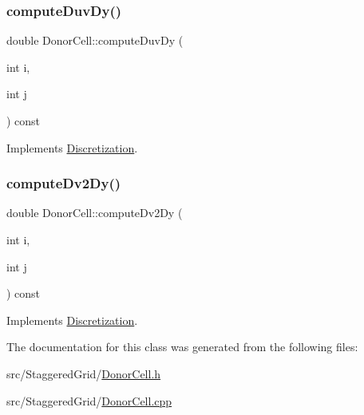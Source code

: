 \subsubsection{\texorpdfstring{computeDuvDy()}{computeDuvDy()}}
{\footnotesize\ttfamily double Donor\+Cell\+::compute\+Duv\+Dy (\begin{DoxyParamCaption}\item[{int}]{i,  }\item[{int}]{j }\end{DoxyParamCaption}) const\hspace{0.3cm}{\ttfamily [virtual]}}



Implements \mbox{\hyperlink{classDiscretization_a0bab86aef10a72e01b4f8102a3c91f84}{Discretization}}.

\mbox{\label{classDonorCell_a7b3026b85f60709b52742cb672af81c1}} 
\subsubsection{\texorpdfstring{computeDv2Dy()}{computeDv2Dy()}}
{\footnotesize\ttfamily double Donor\+Cell\+::compute\+Dv2\+Dy (\begin{DoxyParamCaption}\item[{int}]{i,  }\item[{int}]{j }\end{DoxyParamCaption}) const\hspace{0.3cm}{\ttfamily [virtual]}}



Implements \mbox{\hyperlink{classDiscretization_a69ba136ab7f8c09d805afca159cab428}{Discretization}}.



The documentation for this class was generated from the following files\+:\begin{DoxyCompactItemize}
\item 
src/\+Staggered\+Grid/\mbox{\hyperlink{DonorCell_8h}{Donor\+Cell.\+h}}\item 
src/\+Staggered\+Grid/\mbox{\hyperlink{DonorCell_8cpp}{Donor\+Cell.\+cpp}}\end{DoxyCompactItemize}

